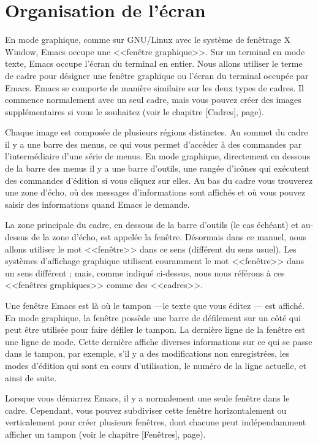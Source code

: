 \chapter{Organisation de l'écran}
En mode graphique, comme sur GNU/Linux avec le système de fenêtrage X
Window, Emacs occupe une <<fenêtre graphique>>. Sur un terminal en
mode texte, Emacs occupe l'écran du terminal en entier. Nous allons
utiliser le terme de cadre pour désigner une fenêtre graphique ou
l'écran du terminal occupée par Emacs. Emacs se comporte de manière
similaire sur les deux types de cadres. Il commence normalement avec
un seul cadre, mais vous pouvez créer des images supplémentaires si
vous le souhaitez (voir le chapitre [Cadres],
page). \par 

Chaque image est composée de plusieurs régions distinctes. Au sommet du
cadre il y a une barre des menus, ce qui vous permet d'accéder à des
commandes par l'intermédiaire d'une série de menus. En mode graphique,
directement en dessous de la barre des menus il y a une barre
d'outils, une rangée d'icônes qui exécutent des commandes d'édition si
vous cliquez sur elles. Au bas du cadre vous trouverez une zone
d'écho, où des messages d'informations sont affichés et où vous pouvez
saisir des informations quand Emacs le demande.\par 

La zone principale du cadre, en dessous de la barre d'outils (le cas
échéant) et au-dessus de la zone d'écho, est appelée la
fenêtre. Désormais dans ce manuel, nous allons utiliser le mot
<<fenêtre>> dans ce sens (différent du sens usuel). Les systèmes
d'affichage graphique utilisent couramment le mot <<fenêtre>> dans un
sens différent ; mais, comme indiqué ci-dessus, nous nous référons à
ces <<fenêtres graphiques>> comme des <<cadres>>.\par

Une fenêtre Emacs est là où le tampon  ---le texte que vous éditez --- est
affiché. En mode graphique, la fenêtre possède une barre de défilement
sur un côté qui peut être utilisée pour faire défiler le tampon. La
dernière ligne de la fenêtre est une ligne de mode. Cette dernière
affiche diverses informations sur ce qui se passe dans le tampon, par
exemple, s'il y a des modifications non enregistrées, les modes
d'édition qui sont en cours d'utilisation, le numéro de la ligne
actuelle, et ainsi de suite.\par

Lorsque vous démarrez Emacs, il y a normalement une seule fenêtre dans
le cadre. Cependant, vous pouvez subdiviser cette fenêtre
horizontalement ou verticalement pour créer plusieurs fenêtres, dont
chacune peut indépendamment afficher un tampon (voir le
chapitre [Fenêtres], page).\par

